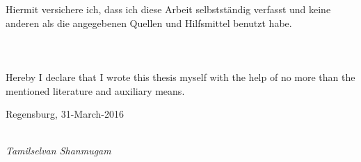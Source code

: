 \newpage

\addtocounter{page}{2}
\begin{large}

\vspace*{6cm}

\noindent
Hiermit versichere ich, dass ich diese Arbeit selbstst\"andig verfasst und keine anderen als die
angegebenen Quellen und Hilfsmittel benutzt habe.\\\\\\\\

Hereby I declare that I wrote this thesis myself with the help of no more than the mentioned literature and auxiliary means.
\vspace{2cm}

\noindent
Regensburg, 31-March-2016

\vspace{1cm}

\hspace*{5cm}%
\dotfill\\
\hspace*{9.1cm}%
\textit{Tamilselvan Shanmugam}

\end{large}
